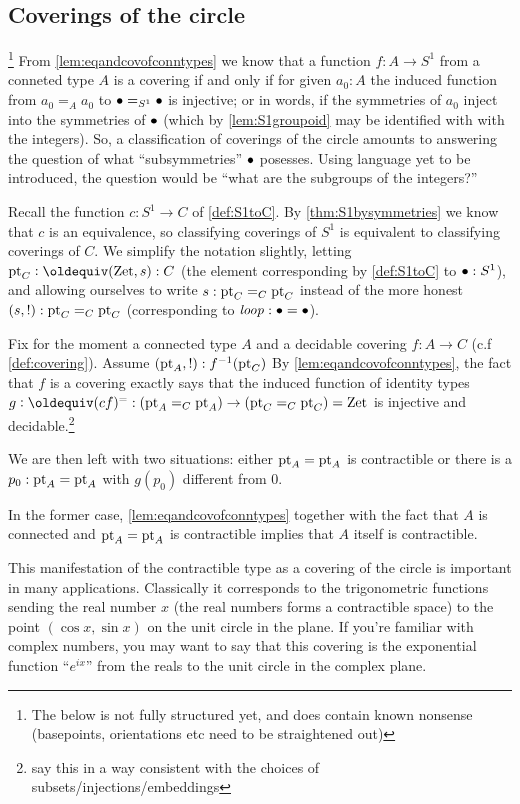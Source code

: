 \subsection{Coverings of the circle}
\label{sec:covS1}

\footnote{The below is not fully structured yet, and does contain known nonsense (basepoints, orientations etc need to be straightened out)}
From \cref{lem:eqandcovofconntypes} we know that a function $f:A\to S^1$ from a conneted type $A$ is a covering if and only if for given $a_0:A$ the induced function from $a_0=_Aa_0$ to $\bullet=_{S^1}\bullet$ is injective; or in words, if the symmetries of $a_0$ inject into the symmetries of $\bullet$ (which by \cref{lem:S1groupoid} may be identified with with the integers).
So, a classification of coverings of the circle amounts to answering the question of what ``subsymmetries'' $\bullet$ posesses.  Using language yet to be introduced, the question would be ``what are the subgroups of the integers?''

 Recall the function $c:S^1\to C$ of \cref{def:S1toC}.  By \cref{thm:S1bysymmetries} we know that $c$ is an equivalence, so classifying coverings of $S^1$ is equivalent to classifying coverings of $C$.  
We simplify the notation slightly, letting $\pt_C\defequi(\zet,s):C$ (the element corresponding by \cref{def:S1toC} to $\bullet:S^1$), and allowing ourselves to write $s:{\mathord{\mathrm{pt}}}_C=_C{\mathord{\mathrm{pt}}}_C$ instead of the more honest $(s,!):{\mathord{\mathrm{pt}}}_C=_C{\mathord{\mathrm{pt}}}_C$ (corresponding to $\mathit{loop}:\bullet=\bullet$).

Fix for the moment a connected type $A$ and a decidable covering $f:A\to C$ (c.f \cref{def:covering}).  Assume $({\mathord{\mathrm{pt}}}_A,!):f^{-1}({\mathord{\mathrm{pt}}}_C)$
By \cref{lem:eqandcovofconntypes}, the fact that $f$ is a covering exactly says that the induced function of identity types
$g\defequi(cf)^=:(\pt_A=_C\pt_A)\to (\pt_C=_C\pt_C)=\zet$ is injective and decidable.\footnote{say this in a way consistent with the choices of subsets/injections/embeddings}    

We are then left with two situations: either ${\mathord{\mathrm{pt}}}_A={\mathord{\mathrm{pt}}}_A$ is contractible or there is a $p_0:{\mathord{\mathrm{pt}}}_A={\mathord{\mathrm{pt}}}_A$ with $g(p_0)$ different from $0$. 

In the former case, \cref{lem:eqandcovofconntypes} together with the fact that $A$ is connected and ${\mathord{\mathrm{pt}}}_A={\mathord{\mathrm{pt}}}_A$ is contractible implies that $A$ itself is contractible.  
\begin{remark}
  This manifestation of the contractible type as a covering of the circle is important in many applications.  Classically it corresponds to the trigonometric functions sending the real number $x$ (the real numbers forms a contractible space) to the point $(\cos x,\sin x)$ on the unit circle in the plane.  If you're familiar with complex numbers, you may want to say that this covering is the exponential function ``$e^{ix}$'' from the reals to the unit circle in the complex plane.
\end{remark}  

